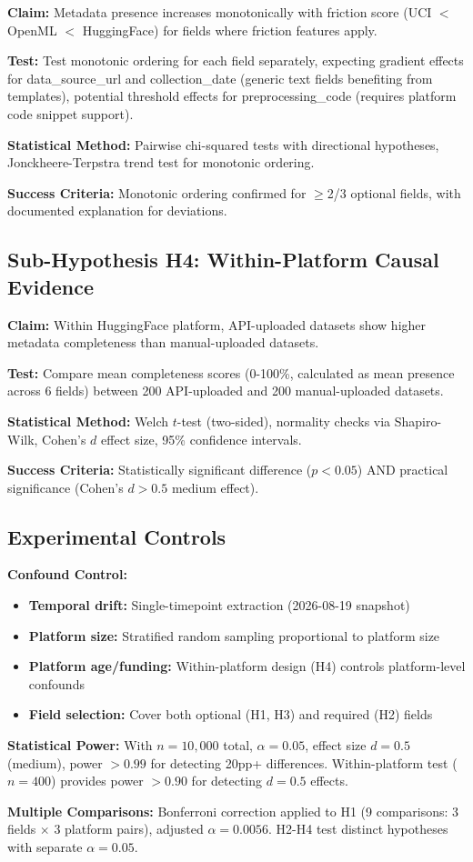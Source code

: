 \textbf{Claim:} Metadata presence increases monotonically with friction score (UCI $<$ OpenML $<$ HuggingFace) for fields where friction features apply.

\textbf{Test:} Test monotonic ordering for each field separately, expecting gradient effects for data\_source\_url and collection\_date (generic text fields benefiting from templates), potential threshold effects for preprocessing\_code (requires platform code snippet support).

\textbf{Statistical Method:} Pairwise chi-squared tests with directional hypotheses, Jonckheere-Terpstra trend test for monotonic ordering.

\textbf{Success Criteria:} Monotonic ordering confirmed for $\geq$2/3 optional fields, with documented explanation for deviations.

\subsection{Sub-Hypothesis H4: Within-Platform Causal Evidence}

\textbf{Claim:} Within HuggingFace platform, API-uploaded datasets show higher metadata completeness than manual-uploaded datasets.

\textbf{Test:} Compare mean completeness scores (0-100\%, calculated as mean presence across 6 fields) between 200 API-uploaded and 200 manual-uploaded datasets.

\textbf{Statistical Method:} Welch $t$-test (two-sided), normality checks via Shapiro-Wilk, Cohen's $d$ effect size, 95\% confidence intervals.

\textbf{Success Criteria:} Statistically significant difference ($p<0.05$) AND practical significance (Cohen's $d>0.5$ medium effect).

\subsection{Experimental Controls}

\textbf{Confound Control:}
\begin{itemize}
\item \textbf{Temporal drift:} Single-timepoint extraction (2026-08-19 snapshot)
\item \textbf{Platform size:} Stratified random sampling proportional to platform size
\item \textbf{Platform age/funding:} Within-platform design (H4) controls platform-level confounds
\item \textbf{Field selection:} Cover both optional (H1, H3) and required (H2) fields
\end{itemize}

\textbf{Statistical Power:} With $n=10{,}000$ total, $\alpha=0.05$, effect size $d=0.5$ (medium), power $>0.99$ for detecting 20pp+ differences. Within-platform test ($n=400$) provides power $>0.90$ for detecting $d=0.5$ effects.

\textbf{Multiple Comparisons:} Bonferroni correction applied to H1 (9 comparisons: 3 fields $\times$ 3 platform pairs), adjusted $\alpha=0.0056$. H2-H4 test distinct hypotheses with separate $\alpha=0.05$.

